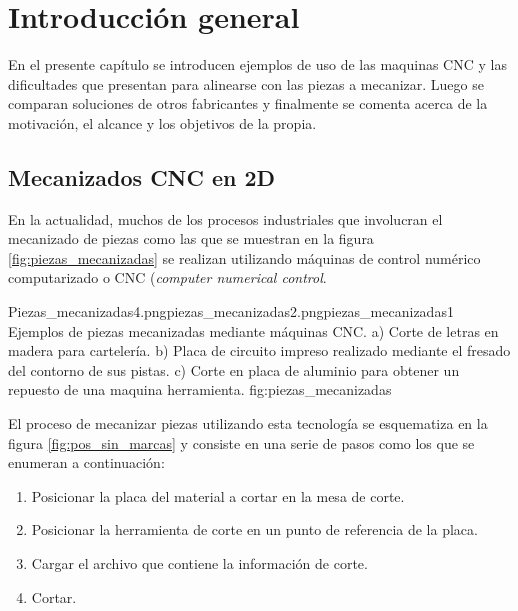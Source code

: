 \chapter{Introducción general} %

En el presente capítulo se introducen ejemplos de uso de las maquinas CNC y las dificultades que presentan para alinearse con las piezas a mecanizar. Luego se comparan soluciones de otros fabricantes y finalmente se comenta acerca de la motivación, el alcance y los objetivos de la propia.

\label{Chapter1} %
\label{IntroGeneral}

\section{Mecanizados CNC en 2D}
En la actualidad, muchos de los procesos industriales que involucran el mecanizado de piezas como las que se muestran en la figura \ref{fig:piezas_mecanizadas} se realizan utilizando máquinas de control numérico computarizado o CNC \citep{WEBSITE:cncwiki} (\textit{computer numerical control}.

            {Piezas_mecanizadas4.png}{piezas_mecanizadas2.png}{piezas_mecanizadas1}
            {Ejemplos de piezas mecanizadas mediante máquinas CNC. a) Corte de letras en madera para cartelería. b) Placa de circuito impreso realizado mediante el fresado del contorno de sus pistas. c) Corte en placa de aluminio para obtener un repuesto de una maquina herramienta.}
            {fig:piezas_mecanizadas}

            El proceso de mecanizar piezas utilizando esta tecnología se esquematiza en la figura \ref{fig:pos_sin_marcas} y consiste en una serie de pasos como los que se enumeran a continuación:

\begin{enumerate}
\item{Posicionar la placa del material a cortar en la mesa de corte.}
\item{Posicionar la herramienta de corte en un punto de referencia de la placa.}
\item{Cargar el archivo que contiene la información de corte.}
\item{Cortar.}
\end{enumerate}

